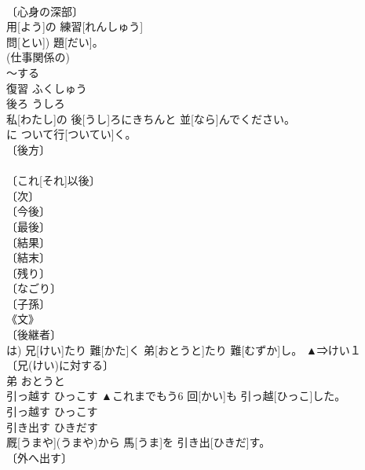 \documentclass[8pt]{extreport}
\begin{document}
\begin{CJK}{UTF8}{min}
\\	〔心身の深部〕 
\\	[⇒しん２ 
\\	心	こころ	
\\	復習	ふくしゅう	
\\	復習[ふくしゅう] 用[よう]の 練習[れんしゅう]
\\	問[とい]) 題[だい]。	
\\	(仕事関係の) 
\\	～する 
\\	復習	ふくしゅう	
\\	後ろ	うしろ	
\\	私[わたし]の 後[うし]ろにきちんと 並[なら]んでください。	
\\	[＝あと１ 
\\	後ろ	うしろ	
\\	後	あと	
\\	後[ご]に ついて行[ついてい]く。	
\\	〔後方〕 
\\	[⇒うしろ] 
\\	〔これ[それ]以後〕 
\\	〔次〕 
\\	〔今後〕 
\\	〔最後〕 
\\	〔結果〕 
\\	〔結末〕 
\\	〔残り〕 
\\	〔なごり〕 
\\	〔子孫〕 
\\	《文》 
\\	〔後継者〕 
\\	[⇒あと２ 
\\	〔後妻〕 
\\	〔追加〕 
\\	〔(接続詞的に)それから〕 
\\	後	あと	
\\	弟	てい	
\\	両者[りょうしゃ]は) 兄[けい]たり 難[かた]く 弟[おとうと]たり 難[むずか]し。	▲⇒けい１ 
\\	〔兄(けい)に対する〕 
\\	[＝おとうと]	弟	おとうと	
\\	引っ越す	ひっこす	▲これまでもう6 回[かい]も 引っ越[ひっこ]した。	
\\	引っ越す	ひっこす	
\\	引き出す	ひきだす	
\\	厩[うまや](うまや)から 馬[うま]を 引き出[ひきだ]す。	
\\	〔外へ出す〕 

\end{CJK}
\end{document}
